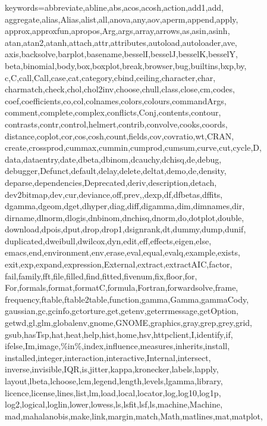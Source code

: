%
{keywords={abbreviate,abline,abs,acos,acosh,action,add1,add,%
        aggregate,alias,Alias,alist,all,anova,any,aov,aperm,append,apply,%
        approx,approxfun,apropos,Arg,args,array,arrows,as,asin,asinh,%
        atan,atan2,atanh,attach,attr,attributes,autoload,autoloader,ave,%
        axis,backsolve,barplot,basename,besselI,besselJ,besselK,besselY,%
        beta,binomial,body,box,boxplot,break,browser,bug,builtins,bxp,by,%
        c,C,call,Call,case,cat,category,cbind,ceiling,character,char,%
        charmatch,check,chol,chol2inv,choose,chull,class,close,cm,codes,%
        coef,coefficients,co,col,colnames,colors,colours,commandArgs,%
        comment,complete,complex,conflicts,Conj,contents,contour,%
        contrasts,contr,control,helmert,contrib,convolve,cooks,coords,%
        distance,coplot,cor,cos,cosh,count,fields,cov,covratio,wt,CRAN,%
        create,crossprod,cummax,cummin,cumprod,cumsum,curve,cut,cycle,D,%
        data,dataentry,date,dbeta,dbinom,dcauchy,dchisq,de,debug,%
        debugger,Defunct,default,delay,delete,deltat,demo,de,density,%
        deparse,dependencies,Deprecated,deriv,description,detach,%
        dev2bitmap,dev,cur,deviance,off,prev,,dexp,df,dfbetas,dffits,%
        dgamma,dgeom,dget,dhyper,diag,diff,digamma,dim,dimnames,dir,%
        dirname,dlnorm,dlogis,dnbinom,dnchisq,dnorm,do,dotplot,double,%
        download,dpois,dput,drop,drop1,dsignrank,dt,dummy,dump,dunif,%
        duplicated,dweibull,dwilcox,dyn,edit,eff,effects,eigen,else,%
        emacs,end,environment,env,erase,eval,equal,evalq,example,exists,%
        exit,exp,expand,expression,External,extract,extractAIC,factor,%
        fail,family,fft,file,filled,find,fitted,fivenum,fix,floor,for,%
        For,formals,format,formatC,formula,Fortran,forwardsolve,frame,%
        frequency,ftable,ftable2table,function,gamma,Gamma,gammaCody,%
        gaussian,gc,gcinfo,gctorture,get,getenv,geterrmessage,getOption,%
        getwd,gl,glm,globalenv,gnome,GNOME,graphics,gray,grep,grey,grid,%
        gsub,hasTsp,hat,heat,help,hist,home,hsv,httpclient,I,identify,if,%
        ifelse,Im,image,\%in\%,index,influence,measures,inherits,install,%
        installed,integer,interaction,interactive,Internal,intersect,%
        inverse,invisible,IQR,is,jitter,kappa,kronecker,labels,lapply,%
        layout,lbeta,lchoose,lcm,legend,length,levels,lgamma,library,%
        licence,license,lines,list,lm,load,local,locator,log,log10,log1p,%
        log2,logical,loglin,lower,lowess,ls,lsfit,lsf,ls,machine,Machine,%
        mad,mahalanobis,make,link,margin,match,Math,matlines,mat,matplot,%
}}
